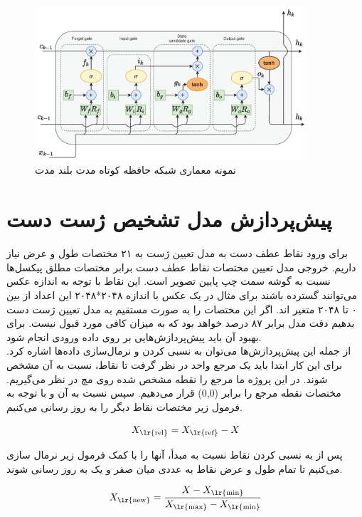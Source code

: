 \begin{figure}[h]
    \centering
    \includegraphics[width=0.9\textwidth]{LSTM.png}
    \caption{نمونه معماری شبکه‌ حافظه کوتاه مدت بلند مدت}
\end{figure}




\section{پیش‌پردازش مدل تشخیص ژست دست}
برای ورود نقاط عطف دست به مدل تعیین ژست به ۲۱ مختصات طول و عرض نیاز داریم. خروجی مدل تعیین مختصات نقاط عطف دست برابر مختصات مطلق پیکسل‌ها نسبت به گوشه سمت 
چپ پایین تصویر است. این نقاط با توجه به اندازه عکس می‌توانند گسترده باشند برای مثال در یک عکس با اندازه ۲۰۴۸*۲۰۴۸ این اعداد از بین ۰ تا ۲۰۴۸ متغیر اند. 
اگر این مختصات را به صورت مستقیم به مدل تعیین ژست دست بدهیم دقت مدل برابر ۸۷ درصد خواهد بود که به میزان کافی مورد قبول نیست. برای بهبود آن باید پیش‌پردازش‌هایی بر روی داده ورودی انجام شود. 
\\
از جمله این پیش‌پردازش‌ها می‌توان به نسبی کردن و نرمال‌سازی داده‌ها اشاره کرد. برای این کار ابتدا باید یک مرجع واحد در نظر گرفت تا نقاط، نسبت به آن مشخص شوند. در این پروژه ما مرجع را نقطه 
مشخص شده روی مچ در نظر می‌گیریم. مختصات نقطه مرجع را برابر (0,0)  قرار می‌دهیم. سپس نسبت به آن و با توجه به فرمول زیر مختصات نقاط دیگر را به روز رسانی می‌کنیم.

\[ X_{\text{\lr{rel}}} = X_{\text{\lr{ref}}} - X \]


پس از به نسبی کردن نقاط نسبت به مبدأ، آنها را با کمک فرمول زیر نرمال سازی می‌کنیم تا تمام طول و عرض نقاط به عددی میان صفر و یک به روز رسانی شوند.

\[ X_{\text{\lr{new}}} = \frac{X - X_{\text{\lr{min}}}}{X_{\text{\lr{max}}} - X_{\text{\lr{min}}}} \]

